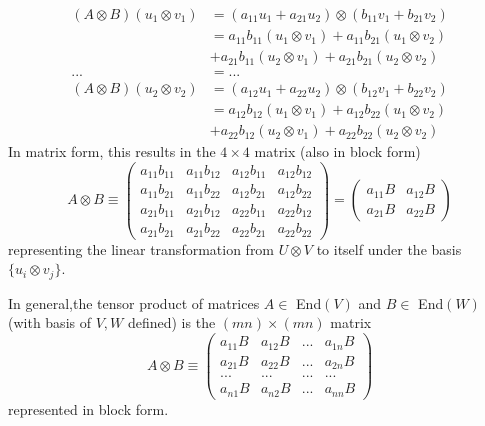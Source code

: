 \documentclass{article}
\begin{document}
    \begin{align*}
        (A \otimes B) (u_1 \otimes v_1) &= (a_{11} u_1 + a_{21} u_2) \otimes (b_{11} v_1 + b_{21} v_2) \\
        & = a_{11} b_{11} (u_1 \otimes v_1) + a_{11} b_{21} (u_1 \otimes v_2) \\
        & + a_{21} b_{11} (u_2 \otimes v_1) + a_{21} b_{21} (u_2 \otimes v_2) \\
        ... & = ... \\
        (A \otimes B) (u_2 \otimes v_2) & = (a_{12} u_1 + a_{22} u_2) \otimes (b_{12} v_1 + b_{22} v_2) \\
        & = a_{12} b_{12} (u_1 \otimes v_1) + a_{12} b_{22} (u_1 \otimes v_2) \\
        & + a_{22} b_{12} (u_2 \otimes v_1) + a_{22} b_{22} (u_2 \otimes v_2) 
    \end{align*}
    In matrix form, this results in the $4\times 4$ matrix (also in block form)
    \[A \otimes B \equiv \begin{pmatrix}
    a_{11} b_{11} & a_{11} b_{12} & a_{12} b_{11} & a_{12} b_{12} \\
    a_{11} b_{21} & a_{11} b_{22} & a_{12} b_{21} & a_{12} b_{22} \\
    a_{21} b_{11} & a_{21} b_{12} & a_{22} b_{11} & a_{22} b_{12} \\
    a_{21} b_{21} & a_{21} b_{22} & a_{22} b_{21} & a_{22} b_{22} 
    \end{pmatrix} = \begin{pmatrix}
    a_{11} B & a_{12} B \\
    a_{21} B & a_{22} B 
    \end{pmatrix}\]
    representing the linear transformation from $U \otimes V$ to itself under the basis $\{u_i \otimes v_j\}$. 
    \begin{proposition}
    In general,the tensor product of matrices $A \in $ End$(V)$ and $B \in $ End$(W)$ (with basis of $V, W$ defined) is the $(m n) \times (m n)$ matrix
    \[A \otimes B \equiv \begin{pmatrix}
    a_{11} B & a_{12} B & ... & a_{1n} B \\
    a_{21} B & a_{22} B & ... & a_{2n} B \\
    ... & ... & ... & ... \\
    a_{n1} B & a_{n2} B & ... & a_{nn} B 
    \end{pmatrix}\]
    represented in block form. 
    \end{proposition}
\end{document}
